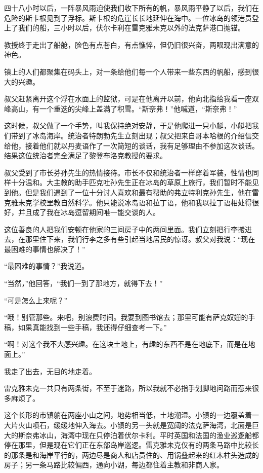 \documentclass[10pt]{book}
\begin{document}
四十八小时以后，一阵暴风雨迫使我们收下所有的帆，暴风雨平静了以后，我们在危险的斯卡根见到了浮标。斯卡根的危崖长长地延伸在海中。一位冰岛的领港员登上了我们的船，三小时以后，伏尔卡利在雷克雅未克以外的法克萨港口抛锚。

教授终于走出了船舱，脸色有点苍白，有点憔悴，但仍旧很兴奋，两眼现出满意的神色。

镇上的人们都聚集在码头上，对一条给他们每一个人带来一些东西的帆船，感到很大的兴趣。

叔父赶紧离开这个浮在水面上的监狱，可是在他离开以前，他向北指给我看一座双峰高山，有一个重迭的尖峰上盖满了积雪。“斯奈弗！”他喊道，“斯奈弗！”

这时候，叔父做了一个手势，叫我保持绝对安静，于是他爬进一只小艇，小艇把我们带到了冰岛海岸。统治者特朗勃先生立刻出现；叔父把来自哥本哈根的介绍信交给他，接着他们就以丹麦语作了一次简短的谈话，我有足够理由不参加这次谈话。结果这位统治者完全满足了黎登布洛克教授的要求。

叔父受到了市长芬孙先生的热情接待。市长不仅和统治者一样穿着军装，性情也同样十分温和。大主教的助手匹克吐孙先生正在冰岛的草原上旅行，我们暂时不能见到他。但是我们遇到了一位十分讨人喜欢和最有帮助的弗立特利克孙先生，他在雷克雅未克学校里教自然科学。他只能说冰岛语和拉丁语，他和我以拉丁语相处得很好，并且成了我在冰岛逗留期间唯一能交谈的人。

这位善良的人把我们安顿在他家的三间房子中的两间里面。我们立刻把行李搬进去，在那里住下来，我们行李之多有些引起当地居民的惊讶。叔父对我说：“现在最困难的事情也解决了！”

“最困难的事情？”我说道。

“当然，”他回答，“我们一到了那地方，就得下去！”

“可是怎么上来呢？”

“哦！别管那些。来吧，别浪费时间。我要到图书馆去；那里可能有萨克奴姗的手稿，如果真能找到一些手稿，我还得仔细查考一下。”

“啊！对这个我不大感兴趣。在这块土地上，有趣的东西不是在地底下，而是在地面上。”

我走了出去，无目的地走着。

雷克雅未克一共只有两条街，不至于迷路，所以我就不必指手划脚地问路而惹来很多麻烦了。

这个长形的市镇躺在两座小山之间，地势相当低，土地潮湿。小镇的一边覆盖着一大片火山喷石，缓缓地伸入海去。小镇的另一头就是宽阔的法克萨海湾，北面是巨大的斯奈弗冰山，海湾中现在只停泊着伏尔卡利。平时英国和法国的渔业巡逻船都停在那里，但是现在它们正在东部岛岸巡逻。雷克雅未克仅有的两条马路中比较长的那条是和海岸平行的，两边尽是商人和店员住的、用锅叠起来的红木柱头造成的房子；另一条马路比较偏西，通向小湖，每边都住着主教和非商人家。
\end{document}
